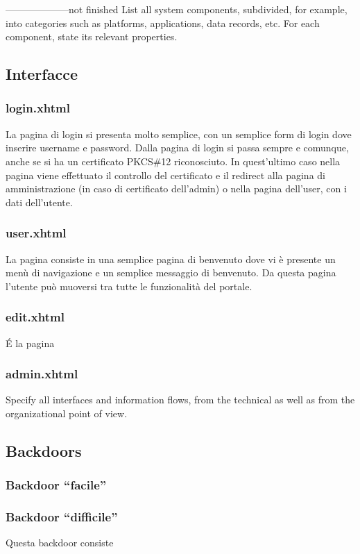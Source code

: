 \documentclass{article}
\begin{document}
 --------------------not finished
List all system components, subdivided, for example, into
  categories such as platforms, applications, data records, etc. For
  each component, state its relevant properties.


\subsection{Interfacce}
\subsubsection*{login.xhtml}
La pagina di login si presenta molto semplice, con un semplice form di login dove inserire username e password. Dalla pagina di login si passa sempre e comunque, anche se si ha un certificato PKCS\#12 riconosciuto. In quest'ultimo caso nella pagina viene effettuato il controllo del certificato e il redirect alla pagina di amministrazione (in caso di certificato dell'admin) o nella pagina dell'user, con i dati dell'utente.
\subsubsection*{user.xhtml}
La pagina consiste in una semplice pagina di benvenuto dove vi è presente un menù di navigazione e un semplice messaggio di benvenuto. Da questa pagina l'utente può muoversi tra tutte le funzionalità del portale.
\subsubsection*{edit.xhtml}
\'E la pagina 
\subsubsection*{admin.xhtml}
Specify  all interfaces and  information flows, from the technical as well as from the
  organizational point of view.

\subsection{Backdoors}

\subsubsection{Backdoor ``facile''}
\subsubsection{Backdoor ``difficile''}
Questa backdoor consiste
\end{document}
